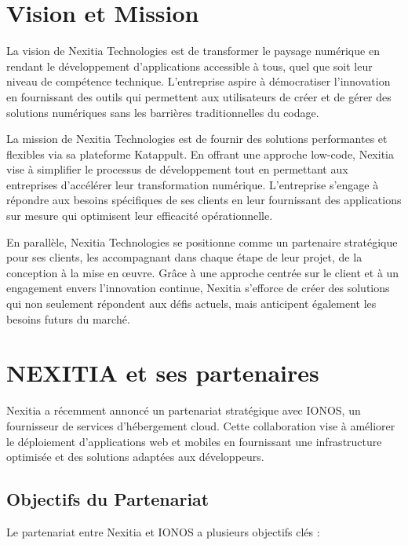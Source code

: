 \documentclass[12pt]{report}
\begin{document}
				\section{Vision et Mission}

				\hspace{15pt} La vision de Nexitia Technologies est de transformer le paysage numérique en rendant le développement d'applications accessible à tous, quel que soit leur niveau de compétence technique. L’entreprise aspire à démocratiser l’innovation en fournissant des outils qui permettent aux utilisateurs de créer et de gérer des solutions numériques sans les barrières traditionnelles du codage.				

				La mission de Nexitia Technologies est de fournir des solutions performantes et flexibles via sa plateforme Katappult. En offrant une approche low-code, Nexitia vise à simplifier le processus de développement tout en permettant aux entreprises d'accélérer leur transformation numérique. L'entreprise s'engage à répondre aux besoins spécifiques de ses clients en leur fournissant des applications sur mesure qui optimisent leur efficacité opérationnelle.

				En parallèle, Nexitia Technologies se positionne comme un partenaire stratégique pour ses clients, les accompagnant dans chaque étape de leur projet, de la conception à la mise en œuvre. Grâce à une approche centrée sur le client et à un engagement envers l'innovation continue, Nexitia s'efforce de créer des solutions qui non seulement répondent aux défis actuels, mais anticipent également les besoins futurs du marché.

				\section{NEXITIA et ses partenaires}

				\hspace{15pt} Nexitia a récemment annoncé un partenariat stratégique avec IONOS, un fournisseur de services d'hébergement cloud. Cette collaboration vise à améliorer le déploiement d'applications web et mobiles en fournissant une infrastructure optimisée et des solutions adaptées aux développeurs.

				\subsection{Objectifs du Partenariat}

				Le partenariat entre Nexitia et IONOS a plusieurs objectifs clés :
\end{document}
